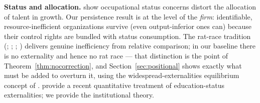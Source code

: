 \documentclass[12pt,letterpaper]{article}
\theoremstyle{definition}
\begin{document}
\textbf{Status and allocation.}
\citet{fershtmanmurphyweiss1996} show occupational status concerns distort the allocation of talent in growth.
Our persistence result is at the level of the \emph{firm}: identifiable, resource-inefficient organizations survive (even output-inferior ones can) because their control rights are bundled with status consumption.
The rat-race tradition (\citealt{akerlof1976caste}; \citealt{hopkinskornienko2004}; \citealt{frank1985demand}; \citealt{hirsch1976social}) delivers genuine inefficiency from relative comparison; in our baseline there is no externality and hence no rat race --- that distinction is the point of Theorem~\ref{thm:nocorrection}, and Section~\ref{sec:positional} shows exactly what must be added to overturn it, using the widespread-externalities equilibrium concept of \citet{noguchizame2006externalities}.
\citet{kimtertiltyum2024} provide a recent quantitative treatment of education-status externalities; we provide the institutional theory.
\end{document}
